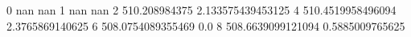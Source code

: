 0 nan nan
1 nan nan
2 510.208984375 2.133575439453125
4 510.4519958496094 2.3765869140625
6 508.0754089355469 0.0
8 508.6639099121094 0.5885009765625

